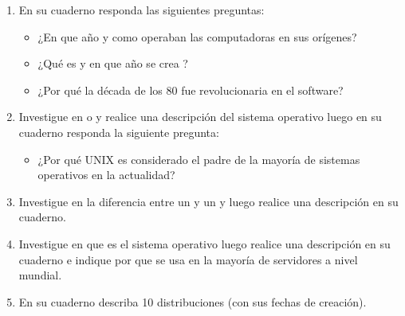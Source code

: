 \documentclass[letterpaper,10pt,spanish]{sphinxmanual}
\begin{document}
\begin{enumerate}
\begin{itemize}
\item {} 
\sphinxAtStartPar
{}

\item {} 
\sphinxAtStartPar
{}

\end{itemize}

\item {} 
\sphinxAtStartPar
En su cuaderno responda las siguientes preguntas:
\begin{itemize}
\item {} 
\sphinxAtStartPar
¿En que año y como operaban las computadoras en sus orígenes?

\item {} 
\sphinxAtStartPar
¿Qué es y en que año se crea ?

\item {} 
\sphinxAtStartPar
¿Por qué la década de los 80 fue revolucionaria en el software?

\end{itemize}

\item {} 
\sphinxAtStartPar
Investigue en  o  y realice una descripción del sistema operativo  luego en su cuaderno responda la siguiente pregunta:
\begin{itemize}
\item {} 
\sphinxAtStartPar
¿Por qué UNIX es considerado el padre de la mayoría de sistemas operativos en la actualidad?

\end{itemize}

\item {} 
\sphinxAtStartPar
Investigue en  la diferencia entre un  y un  y luego realice una descripción en su cuaderno.

\item {} 
\sphinxAtStartPar
Investigue en  que es el sistema operativo  luego realice una descripción en su cuaderno e indique por que se usa en la mayoría de servidores a nivel mundial.

\item {} 
\sphinxAtStartPar
En su cuaderno describa 10 distribuciones  (con sus fechas de creación).


\end{enumerate}
\end{document}
